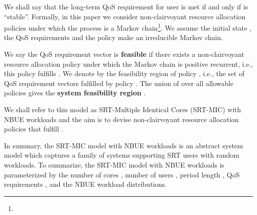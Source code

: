 \documentclass[prodmode,acmtompecs]{acmsmall}
\newcommand{\myComments}[1]{}
\newif\ifinfocom
\newif\iftompecs
\newif\ifdissertation
\newcommand{\infocomStart}{\ifinfocom \myComments{Infocom: }}
\newcommand{\tompecsStart}{\iftompecs \myComments{TOMPECS version: }}
\newcommand{\dissertationStart}{\ifdissertation  \myComments{Dissertation version: }}
\newcommand{\commentEnd}{\myComments{End}}
\begin{document}
We shall say that the long-term QoS requirement  for user  is met if and only if  is ``stable''. 
Formally, in this paper we consider non-clairvoyant resource allocation policies under which the process  is a Markov chain\footnote{
\infocomStart
All the results in this paper can be generalized to a broader range of non-clairvoyant policies and 's with irrational values, see \cite{EXT}. 
\commentEnd\fi
\tompecsStart
All the results in this paper can be generalized to a broader range of non-clairvoyant resource allocation policies under which some variation of  is a Markov chain. For example, if a resource allocation policy depends on the deficit vectors in the past two periods, then  is a Markov chain. For simplicity of explanation, we assume  is a Markov chain.
\commentEnd\fi
}. 
We assume the initial state , the QoS requirements  and the policy make  an irreducible Markov chain. 

\begin{definition}
\label{defn_feasibility_pr}
We say the QoS requirement vector  is {\bf feasible} if there exists a non-clairvoyant resource allocation policy  under which the Markov chain  is positive recurrent, i.e., this policy fulfills . 
We denote by  the feasibility region of policy , i.e., the set of QoS requirement vectors fulfilled by policy . The union of  over all allowable policies gives the {\bf system feasibility region} . 
\end{definition}

We shall refer to this model as SRT-Multiple Identical Cores (SRT-MIC) with NBUE workloads and the aim is to devise non-clairvoyant resource allocation policies that fulfill .

\dissertationStart
Note that different users may require different QoS . For example, in the CRAN context, soft real-time tasks include subframe baseband processing which requires  close to , and channel measurements, which only need to be updated every few subframes and require low , probably . 
\commentEnd\fi

In summary, the SRT-MIC model with NBUE workloads is an abstract system model which captures a family of systems supporting SRT users with random workloads. 
To summarize, the SRT-MIC model with NBUE workloads is parameterized by the number of cores , number of users , period length , QoS requirements , and the NBUE workload distributions. 
\end{document}

